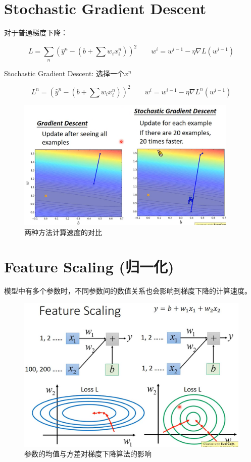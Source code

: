 \documentclass[UTF8,a4paper]{ctexart}
\begin{document}
\section{Stochastic Gradient Descent}

对于普通梯度下降：

\[L=\sum_n \left(\hat{y}^n-\left(b+\sum w_i x_i^n\right)\right)^2\qquad w^i=w^{i-1}-\eta\nabla L(w^{i-1})\]

Stochastic Gradient Descent: 选择一个$x^n$

\begin{equation}
L^n=\left(\hat{y}^n-\left(b+\sum w_i x_i^n\right)\right)^2 \qquad w^i=w^{i-1}-\eta\nabla L^n(w^{i-1})
\end{equation}

\begin{figure}[ht]
\centering
\includegraphics[width=300pt]{stochasticGradientDescent.png}
\caption{两种方法计算速度的对比}
\end{figure}

\section{Feature Scaling (归一化)}

模型中有多个参数时，不同参数间的数值关系也会影响到梯度下降的计算速度。

\newpage

\begin{figure}[ht]
\centering
\includegraphics[width=340pt]{featureScaling.png}
\caption{参数的均值与方差对梯度下降算法的影响}
\end{figure}
\end{document}
